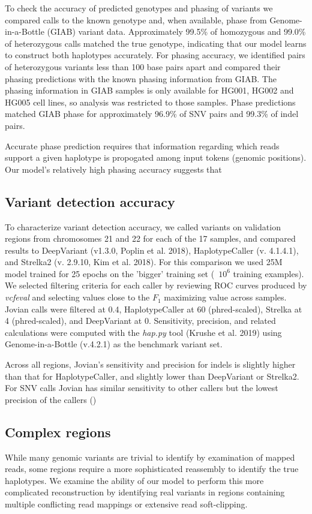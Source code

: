 \documentclass[]{article}
\begin{document}
To check the accuracy of predicted genotypes and phasing of variants we compared calls to the known genotype and, when available, phase from Genome-in-a-Bottle (GIAB) variant data. Approximately 99.5\% of homozygous  and 99.0\% of heterozygous calls matched the true genotype, indicating that our model learns to construct both haplotypes accurately.  For phasing accuracy, we identified pairs of heterozygous variants less than 100 base pairs apart and compared their phasing predictions with the known phasing information from GIAB. The phasing information in GIAB samples is only available for HG001, HG002 and HG005 cell lines, so analysis was restricted to those samples. Phase predictions matched GIAB phase for approximately 96.9\% of SNV pairs and 99.3\% of indel pairs.

Accurate phase prediction requires that information regarding which reads support a given haplotype is propogated among input tokens (genomic positions). Our model's relatively high phasing accuracy suggests that 



\subsection{Variant detection accuracy}

To characterize variant detection accuracy, we called variants on validation regions from chromosomes 21 and 22 for each of the 17 samples, and compared results to DeepVariant (v1.3.0, Poplin et al. 2018), HaplotypeCaller (v. 4.1.4.1), and Strelka2 (v. 2.9.10, Kim et al. 2018). For this comparison we used 25M model trained for 25 epochs on the 'bigger' training set (~$10^6$ training examples). We selected filtering criteria for each caller by reviewing ROC curves produced by \textit{vcfeval} and selecting values close to the $F_1$ maximizing value across samples. Jovian calls were filtered at 0.4, HaplotypeCaller at 60 (phred-scaled), Strelka at 4 (phred-scaled), and DeepVariant at 0. Sensitivity, precision, and related calculations were computed with the \textit{hap.py} tool (Krushe et al. 2019) using Genome-in-a-Bottle (v.4.2.1) as the benchmark variant set. 

Across all regions, Jovian's sensitivity and precision for indels is slightly higher than that for HaplotypeCaller, and slightly lower than DeepVariant or Strelka2. For SNV calls Jovian has similar sensitivity to other callers but the lowest precision of the callers () 


\subsection{Complex regions}
While many genomic variants are trivial to identify by examination of mapped reads, some regions require a more sophisticated reassembly to identify the true haplotypes. We examine the ability of our model to perform this more complicated reconstruction by identifying real variants in regions containing multiple conflicting read mappings or extensive read soft-clipping. 
 
\end{document}
